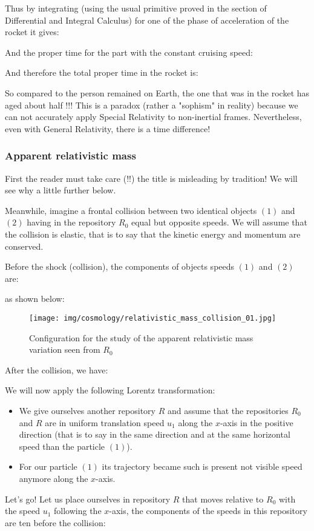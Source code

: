 	Thus by integrating (using the usual primitive proved in the section of Differential and Integral Calculus) for one of the phase of acceleration of the rocket it gives:
	
	And the proper time for the part with the constant cruising speed:
	
	And therefore the total proper time in the rocket is:
	
	So compared to the person remained on Earth, the one that was in the rocket has aged about half !!! This is a paradox (rather a "sophism" in reality) because we can not accurately apply Special Relativity to non-inertial frames. Nevertheless, even with General Relativity, there is a time difference!
	
	\subsubsection{Apparent relativistic mass}
	First the reader must take care (!!) the title is misleading by tradition! We will see why a little further below.

	Meanwhile, imagine a frontal collision between two identical objects $(1)$ and $(2)$ having in the repository $R_0$ equal but opposite speeds. We will assume that the collision is elastic, that is to say that the kinetic energy and momentum are conserved.

	Before the shock (collision), the components of objects speeds $(1)$ and $(2)$ are:
	
	as shown below:
	\begin{figure}[H]
		\begin{center}
		\texttt{[image: img/cosmology/relativistic\_mass\_collision\_01.jpg]}
		\caption{Configuration for the study of the apparent relativistic mass variation seen from $R_0$}
		\end{center}
	\end{figure}
	After the collision, we have:
	
	We will now apply the following Lorentz transformation:
	\begin{itemize}
		\item We give ourselves another repository $R$ and assume that the repositories $R_0$ and $R$ are in uniform translation speed $u_1$ along the $x$-axis in the positive direction (that is to say in the same direction and at the same horizontal speed than the particle $(1)$).
		
		\item For our particle $(1)$ its trajectory became such is present not visible speed anymore along the $x$-axis.
	\end{itemize}
	Let's go! Let us place ourselves in repository $R$ that moves relative to $R_0$ with the speed $u_1$ following the $x$-axis, the components of the speeds in this repository are ten before the collision:
	
